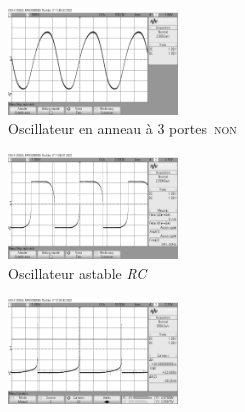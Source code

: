 \documentclass[a4paper,landscape]{article}
\def\figsize{0.4\textwidth}
\begin{document}
	\begin{multicols}{2}
		\begin{figure}[H]
			\centering
			\includegraphics[width=\figsize]{figures/scope_0.png}
			\caption{Oscillateur en anneau à 3 portes~\textsc{non}}
		\end{figure}
		\hfill
		\begin{figure}[H]
			\centering
			\includegraphics[width=\figsize]{figures/scope_1.png}
			\caption{Oscillateur astable \textit{RC}}
		\end{figure}
		\begin{figure}[H]
			\centering
			\includegraphics[width=\figsize]{figures/scope_4.png}

\end{figure}
\end{multicols}
\end{document}
